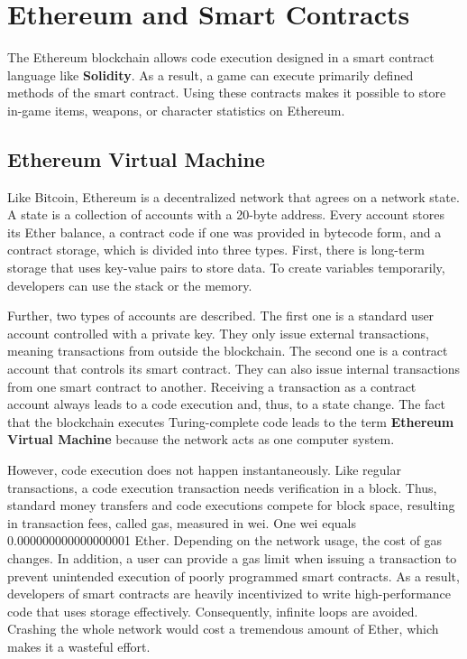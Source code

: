 \chapter{Ethereum and Smart Contracts}
The Ethereum blockchain allows code execution designed in a smart contract language like \textbf{Solidity}. 
As a result, a game can execute primarily defined methods of the smart contract. 
Using these contracts makes it possible to store in-game items, weapons, or character statistics on Ethereum. \cite{buterin2014}

\section{Ethereum Virtual Machine}
Like Bitcoin, Ethereum is a decentralized network that agrees on a network state.
A state is a collection of accounts with a 20-byte address.
Every account stores its Ether balance, a contract code if one was provided in bytecode form, and a contract storage, which is divided into three types.
First, there is long-term storage that uses key-value pairs to store data.
To create variables temporarily, developers can use the stack or the memory.

Further, two types of accounts are described. The first one is a standard user account controlled with a private key. 
They only issue external transactions, meaning transactions from outside the blockchain.
The second one is a contract account that controls its smart contract. 
They can also issue internal transactions from one smart contract to another.
Receiving a transaction as a contract account always leads to a code execution and, thus, to a state change. \cite{ethereum_virtual_machine}
The fact that the blockchain executes Turing-complete code leads to the term \textbf{Ethereum Virtual Machine} because the network acts as one computer system.

However, code execution does not happen instantaneously. 
Like regular transactions, a code execution transaction needs verification in a block.
Thus, standard money transfers and code executions compete for block space, resulting in transaction fees, called gas, measured in wei. 
One wei equals 0.000000000000000001 Ether.
Depending on the network usage, the cost of gas changes.
In addition, a user can provide a gas limit when issuing a transaction to prevent unintended execution of poorly programmed smart contracts.
As a result, developers of smart contracts are heavily incentivized to write high-performance code that uses storage effectively.
Consequently, infinite loops are avoided. 
Crashing the whole network would cost a tremendous amount of Ether, which makes it a wasteful effort.

